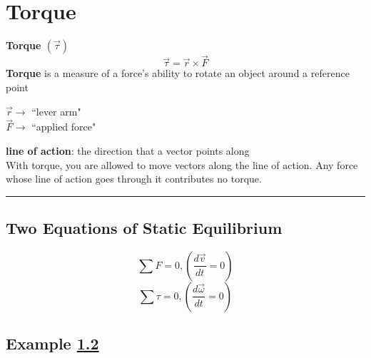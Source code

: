 \documentclass{article}
\begin{document}
\newcommand{\hr}{\par\noindent\rule{\textwidth}{0.4pt}}

\newcommand{\bc}[1]{
	\begin{equation*}
		\begin{boxed}
			{#1}
		\end{boxed}
	\end{equation*}
}

\tableofcontents

\section{Torque}
\textbf{Torque $ (\vec{\tau}) $}
$$ \vec{\tau} = \vec{r} \times \vec{F} $$
\textbf{Torque} is a measure of a force's ability to rotate an object around a reference point

$ \vec{r} \rightarrow $ ``lever arm" \\
$ \vec{F} \rightarrow $ ``applied force"

\textbf{line of action}: the direction that a vector points along \\
With torque, you are allowed to move vectors along the line of action. Any force whose line of action goes through it contributes no torque.

\hr

\subsection{Two Equations of Static Equilibrium}

\begin{equation}
	\sum F = 0, (\frac{d\vec{v}}{dt} = 0)
\end{equation}
\begin{equation}
	\sum \tau = 0, (\frac{d\vec{\omega}}{dt} = 0)
\end{equation}

\subsection{Example \ref{example:1}} \label{example:1}
\end{document}
